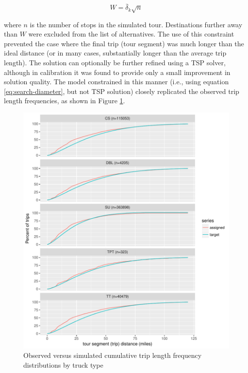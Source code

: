 \begin{equation}\label{eq:search-diameter}
W = {\bar \delta_k} \sqrt{n}
\end{equation}

\noindent where $n$ is the number of stops in the simulated tour. Destinations further away than $W$ were excluded from the list of alternatives. The use of this constraint prevented the case where the final trip (tour segment) was much longer than the ideal distance (or in many cases, substantially longer than the average trip length). The solution can optionally be further refined using a TSP solver, although in calibration it was found to provide only a small improvement in solution quality. The model constrained in this manner (i.e., using equation \ref{eq:search-diameter}, but not TSP solution) closely replicated the observed trip length frequencies, as shown in Figure \ref{fig:ct-observed-trip-lengths}. 

\begin{figure}
\centering
\includegraphics[scale=0.95]{ct/trip-length-comparisons.pdf}
\caption{Observed versus simulated cumulative trip length frequency distributions by truck type}
\label{fig:ct-observed-trip-lengths}
\end{figure}

